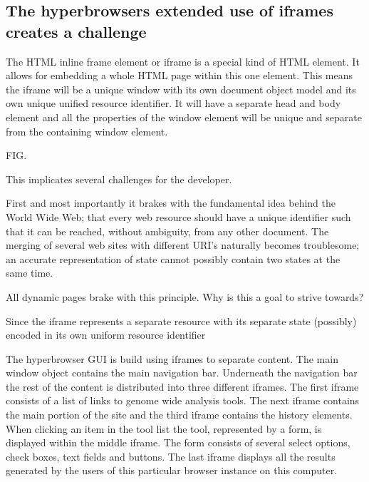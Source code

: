 \documentclass[english]{ifimaster}
\begin{document}

\subsection{The hyperbrowsers extended use of iframes creates a challenge}
The HTML inline frame element or iframe is a special kind of HTML element. It allows for embedding a whole HTML page within this one element. This means the iframe will be a unique window with its own document object model and its own unique unified resource identifier. It will have a separate head and body element and all the properties of the window element will be unique and separate from the containing window element. 

FIG.

This implicates several challenges for the developer. 

First and most importantly it brakes with the fundamental idea behind the World Wide Web; that every web resource should have a unique identifier such that it can be reached, without ambiguity, from any other document. The merging of several web sites with different URI's naturally becomes troublesome; an accurate representation of state cannot possibly contain two states at the same time.

All dynamic pages brake with this principle.
Why is this a goal to strive towards?

Since the iframe represents a separate resource with its separate state (possibly) encoded in its own uniform resource identifier 

The hyperbrowser GUI is build using iframes to separate content. The main window object contains the main navigation bar. Underneath the navigation bar the rest of the content is distributed into three different iframes. The first iframe consists of a list of links to genome wide analysis tools. The next iframe contains the main portion of the site and the third iframe contains the history elements. When clicking an item in the tool list the tool, represented by a form, is displayed within the middle iframe. The form consists of several select options, check boxes, text fields and buttons. The last iframe displays all the results generated by the users of this particular browser instance on this computer.
\end{document}
